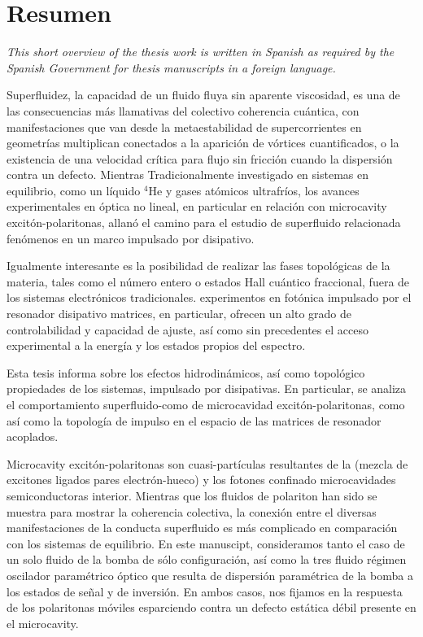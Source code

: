 \chapter*{Resumen}


\textit{This short overview of the thesis work is written in Spanish as required by the Spanish Government for thesis manuscripts in a foreign language.}

Superfluidez, la capacidad de un fluido fluya sin aparente viscosidad,
es una de las consecuencias más llamativas del colectivo coherencia
cuántica, con manifestaciones que van desde la metaestabilidad de
supercorrientes en geometrías multiplican conectados a la aparición de
vórtices cuantificados, o la existencia de una velocidad crítica para
flujo sin fricción cuando la dispersión contra un defecto. Mientras
Tradicionalmente investigado en sistemas en equilibrio, como un
líquido ${}^4$He y gases atómicos ultrafríos, los avances
experimentales en óptica no lineal, en particular en relación con
microcavity excitón-polaritonas, allanó el camino para el estudio de
superfluido relacionada fenómenos en un marco impulsado por
disipativo.

Igualmente interesante es la posibilidad de realizar las fases
topológicas de la materia, tales como el número entero o estados Hall
cuántico fraccional, fuera de los sistemas electrónicos
tradicionales. experimentos en fotónica impulsado por el resonador
disipativo matrices, en particular, ofrecen un alto grado de
controlabilidad y capacidad de ajuste, así como sin precedentes el
acceso experimental a la energía y los estados propios del espectro.

Esta tesis informa sobre los efectos hidrodinámicos, así como
topológico propiedades de los sistemas, impulsado por disipativas. En
particular, se analiza el comportamiento superfluido-como de
microcavidad excitón-polaritonas, como así como la topología de
impulso en el espacio de las matrices de resonador acoplados.

Microcavity excitón-polaritonas son cuasi-partículas resultantes de la
(mezcla de excitones ligados pares electrón-hueco) y los fotones
confinado microcavidades semiconductoras interior. Mientras que los
fluidos de polariton han sido se muestra para mostrar la coherencia
colectiva, la conexión entre el diversas manifestaciones de la
conducta superfluido es más complicado en comparación con los sistemas
de equilibrio. En este manuscipt, consideramos tanto el caso de un
solo fluido de la bomba de sólo configuración, así como la tres fluido
régimen oscilador paramétrico óptico que resulta de dispersión
paramétrica de la bomba a los estados de señal y de inversión. En
ambos casos, nos fijamos en la respuesta de los polaritonas móviles
esparciendo contra un defecto estática débil presente en el
microcavity.

